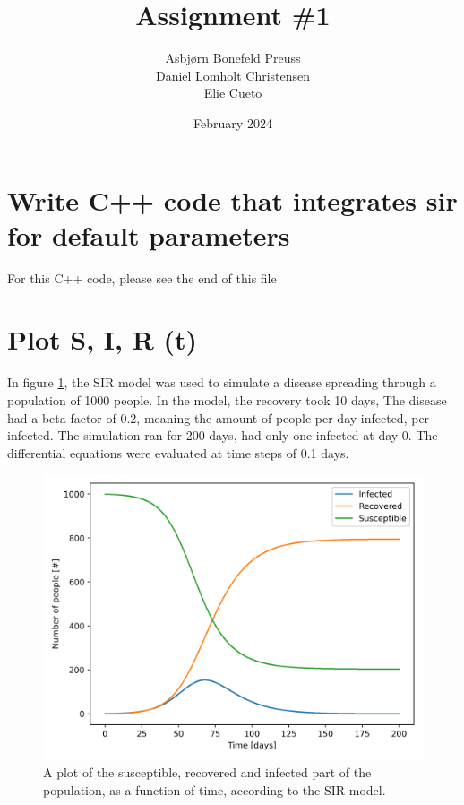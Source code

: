 \documentclass{article}
\title{Assignment \#1}
\author{Asbjørn Bonefeld Preuss\\ Daniel Lomholt Christensen \\ Elie Cueto}
\date{February 2024}
\begin{document}
\maketitle
\section*{Write C++ code that integrates sir for default parameters}
For this C++ code, please see the end of this file
\section*{Plot S, I, R (t)}
In figure \ref{fig: sir_fig}, the SIR model was used to simulate a disease spreading through a population of 1000 people. In the model, the recovery took 10 days, The disease had a beta factor of 0.2, meaning the amount of people per day infected, per infected. The simulation ran for 200 days, had only one infected at day 0. The differential equations were evaluated at time steps of 0.1 days.
\begin{figure}
    \centering
    \includegraphics[width=\textwidth]{Assignment_1_SIR/Report/Images/SIR_plot.png} 
    \caption{A plot of the susceptible, recovered and infected part of the population, as a function of time, according to the SIR model.}
    \label{fig: sir_fig}
\end{figure}
\end{document}
